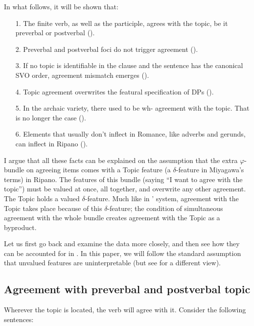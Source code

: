 \documentclass[output=paper
,modfonts
,nonflat]{langsci/langscibook}
\begin{document}
In what follows, it will be shown that:

\begin{enumerate}
\item[1.]The finite verb, as well as the participle, agrees with the topic, be it preverbal or postverbal ().
\item[2.]Preverbal and postverbal foci do not trigger agreement ().
\item[3.]If no topic is identifiable in the clause and the sentence has the canonical SVO order, agreement mismatch emerges ().
\item[4.]Topic agreement overwrites the featural specification of DPs ().
\item[5.]In the archaic variety, there used to be wh- agreement with the topic. That is no longer the case ().
\item[6.]Elements that usually don’t inflect in Romance, like adverbs and gerunds, can inflect in Ripano ().
\end{enumerate}
I argue that all these facts can be explained on the assumption that the extra $\varphi $-bundle on agreeing items comes with a Topic feature (a $\delta $-feature in Miyagawa’s terms) in Ripano. The features of this bundle (saying “I want to agree with the topic”) must be valued at once, all together, and overwrite any other agreement. The Topic holds a valued $\delta $-feature. Much like in \citeauthor{Carstens2005a}’ system, agreement with the Topic takes place because of this $\delta $-feature; the condition of simultaneous agreement with the whole bundle creates agreement with the Topic as a byproduct.

\noindent Let us first go back and examine the data more closely, and then see how they can be accounted for in . In this paper, we will follow the standard assumption that unvalued features are uninterpretable (but see  \citealt{Pesetsky_Torrego2007} for a different view). 

\subsection{Agreement with preverbal and postverbal topic}\label{sec-dalessandro:4.2}
Wherever the topic is located, the verb will agree with it. Consider the following sentences:\largerpage
\end{document}
